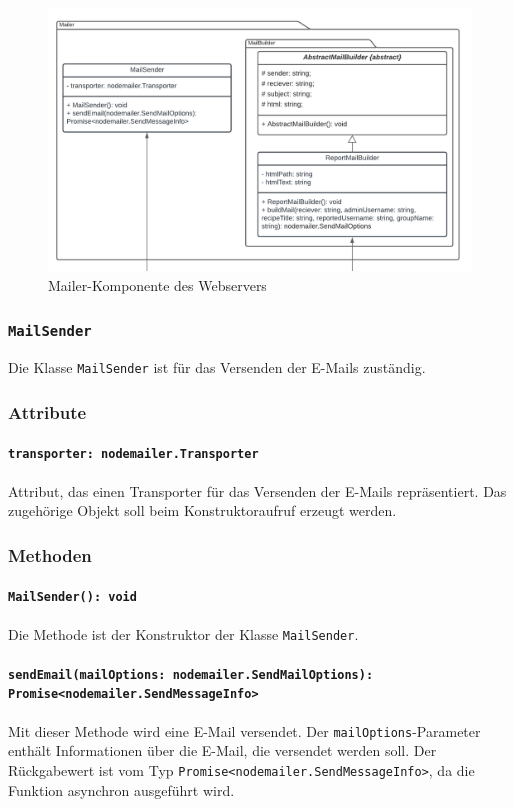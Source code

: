 \documentclass{entwurfsheft}
\begin{document}
\begin{figure}[htp]
    \centering
    \includegraphics[width = 1\textwidth]{images/webserver/mailer.pdf}
    \caption{Mailer-Komponente des Webservers}
    \label{fig:mailer}
\end{figure}

\subsubsection{\texttt{MailSender}}\label{sec:MailSender}
Die Klasse \texttt{MailSender} ist für das Versenden der E-Mails zuständig.

\subsubsection*{Attribute}
\paragraph{\texttt{transporter: nodemailer.Transporter}}
Attribut, das einen Transporter für das Versenden der E-Mails repräsentiert. Das zugehörige Objekt soll beim Konstruktoraufruf erzeugt werden.
\subsubsection*{Methoden}
\paragraph{\texttt{MailSender(): void}}
Die Methode ist der Konstruktor der Klasse \texttt{MailSender}.
\paragraph{\texttt{sendEmail(mailOptions: nodemailer.SendMailOptions): Promise<nodemailer.SendMessageInfo>}}
Mit dieser Methode wird eine E-Mail versendet. Der \texttt{mailOptions}-Parameter enthält Informationen über die E-Mail, die versendet werden soll. Der Rückgabewert ist vom Typ \texttt{Promise<nodemailer.SendMessageInfo>}, da die Funktion asynchron ausgeführt wird.
\end{document}
